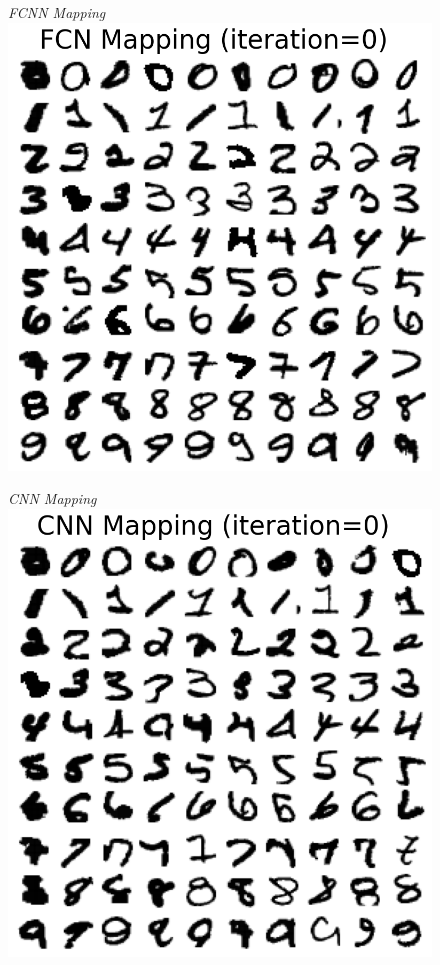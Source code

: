 \documentclass{article}
\numberwithin{equation}{section}
\begin{document}
\begin{figure}[h!]
\small
\centering
\begin{minipage}{.25\textwidth}
  \centering
  \textit{FCNN Mapping}
  \includegraphics[width=\linewidth, trim={0 0 0 1.5cm},clip]{thesis_report/figures/custom_mapping/fcn/iteration_0.png}
\end{minipage}%
\begin{minipage}{.25\textwidth}
  \centering
  \textit{CNN Mapping}
  \includegraphics[width=\linewidth, trim={0 0 0 1.5cm},clip]{thesis_report/figures/custom_mapping/cnn/iteration_0.png}

\end{minipage}
\end{figure}
\end{document}
